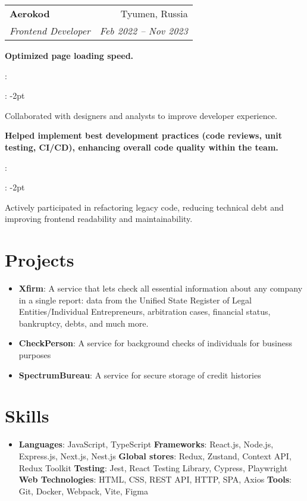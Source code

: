 \documentclass[letterpaper,11pt]{article}
\makeatletter
\newcommand{\resumeItem}[2]{
  \item\small{
    \textbf{#1}{: #2 \vspace{-2pt}}
  }
}
\newcommand{\resumeSubheading}[4]{
  \vspace{-1pt}\item
    \begin{tabular*}{0.97\textwidth}[t]{l@{\extracolsep{\fill}}r}
      \textbf{#1} & #2 \\
      \textit{\small#3} & \textit{\small #4} \\
    \end{tabular*}\vspace{-5pt}
}
\newcommand{\resumeSubItem}[2]{\resumeItem{#1}{#2}\vspace{-4pt}}
\newcommand{\resumeSubHeadingListStart}{\begin{itemize}[leftmargin=*]}
\newcommand{\resumeSubHeadingListEnd}{\end{itemize}}
\newcommand{\resumeItemListStart}{\begin{itemize}}
\newcommand{\resumeItemListEnd}{\end{itemize}\vspace{-5pt}}
\makeatother
\begin{document}
    \resumeSubheading
      {Aerokod}{Tyumen, Russia}
      {Frontend Developer}{Feb 2022 -- Nov 2023}
      \resumeItemListStart
        \resumeItem
        {Optimized page loading speed.}
        \resumeItem
        {Collaborated with designers and analysts to improve developer experience.}
        \resumeItem
        {Helped implement best development practices (code reviews, unit testing, CI/CD), enhancing overall code quality within the team.}
        \resumeItem
        {Actively participated in refactoring legacy code, reducing technical debt and improving frontend readability and maintainability.}
      \resumeItemListEnd
      

\section{Projects}
  \resumeSubHeadingListStart
    \resumeSubItem{Xfirm}
      {A service that lets check all essential information about any company in a single report: data from the Unified State Register of Legal Entities/Individual Entrepreneurs, arbitration cases, financial status, bankruptcy, debts, and much more.}
    \resumeSubItem{CheckPerson}
    {A service for background checks of individuals for business purposes}
    \resumeSubItem{SpectrumBureau}
    {A service for secure storage of credit histories}
  \resumeSubHeadingListEnd


\section{Skills}
  \resumeSubHeadingListStart
    \item{
      \textbf{Languages}{: JavaScript, TypeScript}
      \hfill
      \textbf{Frameworks}{: React.js, Node.js, Express.js, Next.js, Nest.js}
      \hfill
      \textbf{Global stores}{: Redux, Zustand, Context API, Redux Toolkit}
      \hfill
      \textbf{Testing}{: Jest, React Testing Library, Cypress, Playwright
      \hfill
      \textbf{Web Technologies}{: HTML, CSS, REST API, HTTP, SPA, Axios}
      \hfill
      \textbf{Tools}{: Git, Docker, Webpack, Vite, Figma}
      }
   }
  \resumeSubHeadingListEnd


\end{document}

